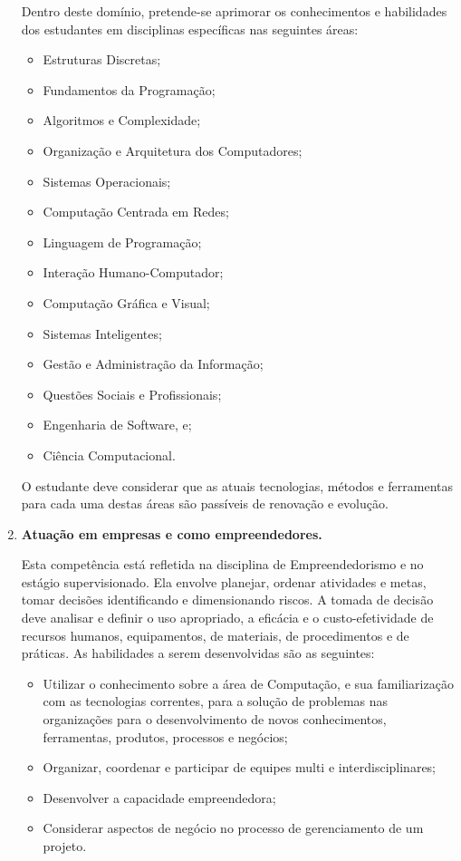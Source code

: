 \begin{enumerate}
    Dentro deste domínio, pretende-se aprimorar os conhecimentos e habilidades
    dos estudantes em disciplinas específicas nas seguintes áreas:
    \begin{itemize}
        \item Estruturas Discretas;
        \item Fundamentos da Programação;
        \item Algoritmos e Complexidade;
        \item Organização e Arquitetura dos Computadores;
        \item Sistemas Operacionais;
        \item Computação Centrada em Redes;
        \item Linguagem de Programação;
        \item Interação Humano-Computador;
        \item Computação Gráfica e Visual;
        \item Sistemas Inteligentes;
        \item Gestão e Administração da Informação;
        \item Questões Sociais e Profissionais;
        \item Engenharia de Software, e;
        \item Ciência Computacional.
    \end{itemize}

    O estudante deve considerar que as atuais tecnologias, métodos e
    ferramentas para cada uma destas áreas são passíveis de renovação e
    evolução.

    \item \textbf{Atuação em empresas e como empreendedores.}

    Esta competência está refletida na disciplina de Empreendedorismo e no
    estágio supervisionado.
    Ela envolve planejar, ordenar atividades e metas, tomar decisões
    identificando e dimensionando riscos.
    A tomada de decisão deve analisar e definir o uso apropriado, a eficácia e
    o custo-efetividade de recursos humanos, equipamentos, de materiais, de
    procedimentos e de práticas.
    As habilidades a serem desenvolvidas são as seguintes:
    \begin{itemize}
        \item Utilizar o conhecimento sobre a área de Computação, e sua
        familiarização com as tecnologias correntes, para a solução de
        problemas nas organizações para o desenvolvimento de novos
        conhecimentos, ferramentas, produtos, processos e negócios;
        \item Organizar, coordenar e participar de equipes multi e
        interdisciplinares;
        \item Desenvolver a capacidade empreendedora;
        \item Considerar aspectos de negócio no processo de gerenciamento de um
        projeto.
    \end{itemize}


\end{enumerate}
